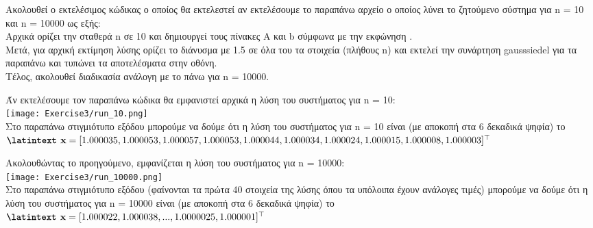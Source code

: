 \documentclass[a4paper,11pt]{article}
\newcommand{\lt}{\latintext}
\begin{document}
\par
Ακολουθεί ο εκτελέσιμος κώδικας ο οποίος θα εκτελεστεί αν εκτελέσουμε το παραπάνω αρχείο ο οποίος λύνει το ζητούμενο σύστημα για {\lt n = 10} και {\lt n = 10000} ως εξής:\\
Αρχικά ορίζει την σταθερά {\lt n} σε 10 και δημιουργεί τους πίνακες Α και {\lt b} σύμφωνα με την εκφώνηση .\\
Μετά, για αρχική εκτίμηση λύσης ορίζει το διάνυσμα με 1.5 σε όλα του τα στοιχεία (πλήθους {\lt n}) και εκτελεί την συνάρτηση {\lt gauss\textunderscore siedel} για τα παραπάνω και τυπώνει τα αποτελέσματα στην οθόνη.\\
Τέλος, ακολουθεί  διαδικασία ανάλογη με το πάνω για {\lt n = 10000}.\\

\par
Άν εκτελέσουμε τον παραπάνω κώδικα θα εμφανιστεί αρχικά η λύση του συστήματος για {\lt n} = 10:\\
\texttt{[image: Exercise3/run\_10.png]}\\

Στο παραπάνω στιγμιότυπο εξόδου μπορούμε να δούμε ότι η λύση του συστήματος για {\lt n} = 10 είναι (με αποκοπή στα 6 δεκαδικά ψηφία) το $\textbf{\lt x} = [1.000035, 1.000053, 1.000057, 1.000053, 1.000044, 1.000034,\\ 1.000024, 1.000015, 1.000008, 1.000003]^\top$ \\

\par
Ακολουθώντας το προηγούμενο, εμφανίζεται η λύση του συστήματος για {\lt n} = 10000:\\

\texttt{[image: Exercise3/run\_10000.png]}\\

Στο παραπάνω στιγμιότυπο εξόδου (φαίνονται τα πρώτα 40 στοιχεία της λύσης όπου τα υπόλοιπα έχουν ανάλογες τιμές) μπορούμε να δούμε ότι η λύση του συστήματος για {\lt n} = 10000 είναι (με αποκοπή στα 6 δεκαδικά ψηφία) το $\textbf{\lt x} = [1.000022, 1.000038, ..., 1.0000025, 1.000001]^\top$\\
\end{document}
